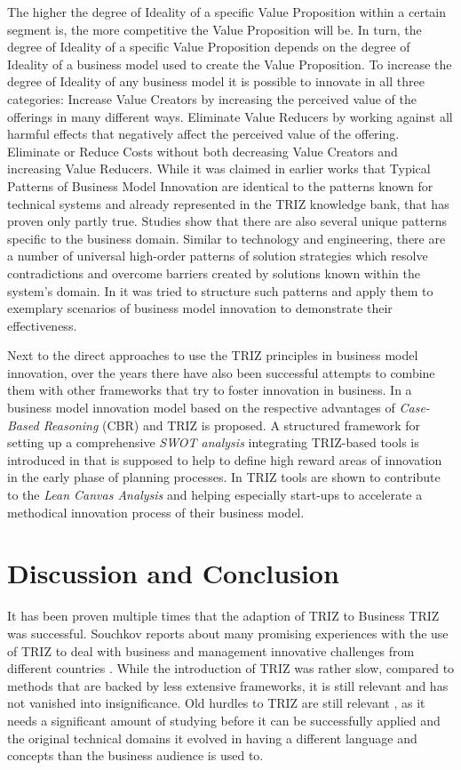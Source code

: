 \documentclass[11pt,a4paper]{article}
\begin{document}
The higher the degree of Ideality of a specific Value Proposition within a
certain segment is, the more competitive the Value Proposition will be. In
turn, the degree of Ideality of a specific Value Proposition depends on the
degree of Ideality of a business model used to create the Value
Proposition. To increase the degree of Ideality of any business model it is
possible to innovate in all three categories: Increase Value Creators by
increasing the perceived value of the offerings in many different
ways. Eliminate Value Reducers by working against all harmful effects that
negatively affect the perceived value of the offering. Eliminate or Reduce
Costs without both decreasing Value Creators and increasing Value Reducers.
While it was claimed in earlier works that Typical Patterns of Business Model
Innovation are identical to the patterns known for technical systems and
already represented in the TRIZ knowledge bank, that has proven only partly
true. Studies show that there are also several unique patterns specific to the
business domain. Similar to technology and engineering, there are a number of
universal high-order patterns of solution strategies which resolve
contradictions and overcome barriers created by solutions known within the
system’s domain. In \cite{15} it was tried to structure such patterns and
apply them to exemplary scenarios of business model innovation to demonstrate
their effectiveness.

Next to the direct approaches to use the TRIZ principles in business model
innovation, over the years there have also been successful attempts to combine
them with other frameworks that try to foster innovation in business. In
\cite{17} a business model innovation model based on the respective advantages
of \emph{Case-Based Reasoning} (CBR) and TRIZ is proposed. A structured
framework for setting up a comprehensive \emph{SWOT analysis} integrating
TRIZ-based tools is introduced in \cite{18} that is supposed to help to define
high reward areas of innovation in the early phase of planning processes. In
\cite{19} TRIZ tools are shown to contribute to the \emph{Lean Canvas
  Analysis} and helping especially start-ups to accelerate a methodical
innovation process of their business model.

\section{Discussion and Conclusion}

It has been proven multiple times that the adaption of TRIZ to Business TRIZ
was successful. Souchkov reports about many promising experiences with the use
of TRIZ to deal with business and management innovative challenges from
different countries \cite{5}. While the introduction of TRIZ was rather slow,
compared to methods that are backed by less extensive frameworks, it is still
relevant and has not vanished into insignificance. Old hurdles to TRIZ are
still relevant \cite{20}, as it needs a significant amount of studying before
it can be successfully applied and the original technical domains it evolved
in having a different language and concepts than the business audience is used
to.
\end{document}
